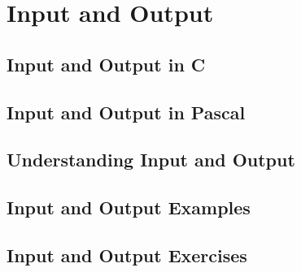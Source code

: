 \chapter{Input and Output} %
\label{cha:input_and_output}

\minitoc





\clearpage
\section{Input and Output in C} %
\label{sec:input_and_output_in_c}


\clearpage
\section{Input and Output in Pascal} %
\label{sec:input_and_output_in_pascal}


\clearpage
\section{Understanding Input and Output} %
\label{sec:understanding_input_and_output}


\clearpage
\section{Input and Output Examples} %
\label{sec:input_and_output_examples}


\clearpage
\section{Input and Output Exercises} %
\label{sec:input_and_output_exercises}



